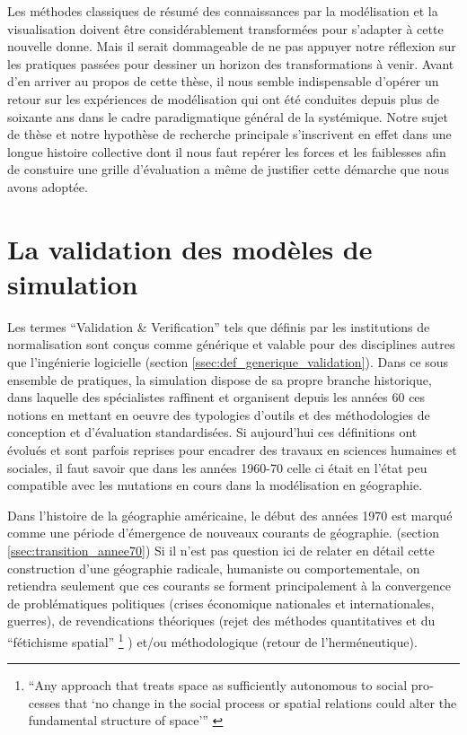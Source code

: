 Les méthodes classiques de résumé des connaissances par la modélisation et la visualisation doivent être considérablement transformées pour s’adapter à cette nouvelle donne. Mais il serait dommageable de ne pas appuyer notre réflexion sur les pratiques passées pour dessiner un horizon des transformations à venir. Avant d’en arriver au propos de cette thèse, il nous semble indispensable d’opérer un retour sur les expériences de modélisation qui ont été conduites depuis plus de soixante ans dans le cadre paradigmatique général de la systémique. Notre sujet de thèse et notre hypothèse de recherche principale s’inscrivent en effet dans une longue histoire collective dont il nous faut repérer les forces et les faiblesses afin de constuire une grille d'évaluation a même de justifier cette démarche que nous avons adoptée.



\section{La validation des modèles de simulation}
\label{sec:constante_problematique}

Les termes \enquote{Validation \& Verification} tels que définis par les institutions de normalisation sont conçus comme générique et valable pour des disciplines autres que l'ingénierie logicielle (section \ref{ssec:def_generique_validation}). Dans ce sous ensemble de pratiques, la simulation dispose de sa propre branche historique, dans laquelle des spécialistes raffinent et organisent depuis les années 60 ces notions en mettant en oeuvre des typologies d'outils et des méthodologies de conception et d'évaluation standardisées. \autocite{Nance2002} Si aujourd'hui ces définitions ont évolués et sont parfois reprises pour encadrer des travaux en sciences humaines et sociales, il faut savoir que dans les années 1960-70 celle ci était en l'état peu compatible avec les mutations en cours dans la modélisation en géographie. 

Dans l'histoire de la géographie américaine, le début des années 1970 est marqué comme une période d'émergence de nouveaux courants de géographie. (section \ref{ssec:transition_annee70}) Si il n'est pas question ici de relater en détail cette construction d'une géographie radicale, humaniste ou comportementale, on retiendra seulement que ces courants se forment principalement à la convergence de problématiques politiques (crises économique nationales et internationales, guerres), de revendications théoriques (rejet des méthodes quantitatives et du \enquote{fétichisme spatial} \footnote{\foreignquote{english}{Any approach that treats space as sufficiently autonomous to social processes that ‘no change in the social process or spatial relations could alter the fundamental structure of space’} \autocite[712]{Gregory2009}} ) et/ou méthodologique (retour de l’herméneutique). 

